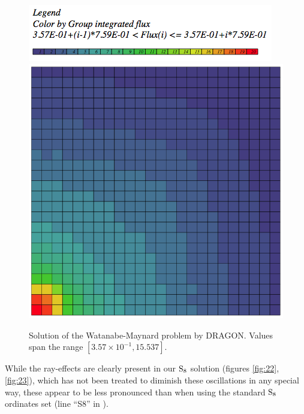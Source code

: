 \begin{figure}[!ht]
\centering
  \includegraphics[scale=.42]{wm1/DRAGONl}\\
  \includegraphics[scale=.25]{wm1/DRAGON}
  \caption{Solution of the Watanabe-Maynard problem by DRAGON. Values span the range $[3.57\times 10^{-1},
  15.537]$.}
  \label{fig:24}
\end{figure}

While the ray-effects are clearly present in our $\SN[8]$ solution (figures \ref{fig:22}, \ref{fig:23}),
which has not been treated to diminish these oscillations in any special way, these appear to be less pronounced than
when using the standard $\SN[8]$ ordinates set (line ``S8'' in ). 


